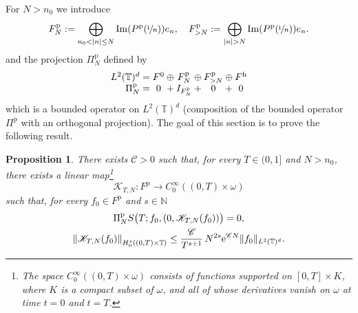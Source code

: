 \documentclass[JEP,XML,SOM,Unicode,NoEqCountersInSection]{cedram}
\let\mathcal\mathscr
\theoremstyle{plain}
\newtheorem{prop}[theorem]{Proposition}
\theoremstyle{definition}
\theoremstyle{remark}
\DeclareMathOperator{\Ima}{Im}
\newcommand{\set}{\mathbb}
\newcommand{\N}{\set{N}}
\newcommand{\T}{\set{T}}
\newcommand{\coloneqq}{\mathrel{\mathord{:}\mathord=}}
\newcommand{\h}{{\mathrm h}}
\newcommand{\p}{{\mathrm p}}
\newcommand{\eu}{\mathrm e}
\newcommand{\iu}{\mathrm i}
\let\originalleft\left
\let\originalright\right
\renewcommand{\left}{\mathopen{}\mathclose\bgroup\originalleft}
\renewcommand{\right}{\aftergroup\egroup\originalright}
\begin{document}

For $N>n_0$ we introduce
\begin{equation} \label{def:FpN}
F^\p_N \coloneqq \bigoplus\limits_{n_0 < |n| \leq N} \Ima\left(P^\p(\sfrac{\iu}{n})\right) e_n,
\quad
F^\p_{>N} \coloneqq\bigoplus\limits_{|n|>N } \Ima\left(P^\p(\sfrac{\iu}{n})\right) e_n.
\end{equation}
and the projection $\Pi^\p_N$ defined by
\[
\begin{array}{r@{}c@{}c@{}c@{}c@{}c@{}c@{}c@{}c}
L^2(\T)^d & {}={} & F^0 & {}\oplus{} & F^\p_N & {}\oplus{} & F^\p_{>N} & {}\oplus{} & F^\h \\
\Pi^\p_N &{} = {}& 0 &{} + {}& I_{F^\p_N} &{} +{} & 0 & {}+{} & 0
\end{array}
\]
which is a bounded operator on $L^2(\T)^d$ (composition of the bounded operator $\Pi^\p$ with an orthogonal projection).
The goal of this section is to prove the following result.

\begin{prop} \label{Prop:FNPF}
There exists $\mathcal{C}>0$ such that, for every $T \in(0,1]$ and $N>n_0$, there exists a linear map\footnote{The space $C_0^\infty((0,T)\times \omega)$ consists of functions supported on $[0,T]\times K$, where $K$ is a compact subset of $\omega$, and
all of whose derivatives vanish on $\omega$ at time $t=0$ and $t=T$.}
\[
\mathcal{K}_{T,N}\colon F^\p \to C^\infty_0((0,T) \times \omega)
\]
such that, for every $f_0 \in F^\p$ and $s \in\N$
\begin{gather*}
\Pi^\p_N S \bigl(T ; f_0, \left(0,\mathcal{K}_{T,N}(f_0)\right) \bigr) = 0,\\
\left\| \mathcal{K}_{T,N}(f_0) \right\|_{H_0^s((0,T)\times\T)} \leq \frac{\mathcal{C} }{ T^{s+1} }\, N^{2s} \eu^{\mathcal{C} N} \|f_0\|_{L^2(\T)^d}.
\end{gather*}
\end{prop}
\end{document}
